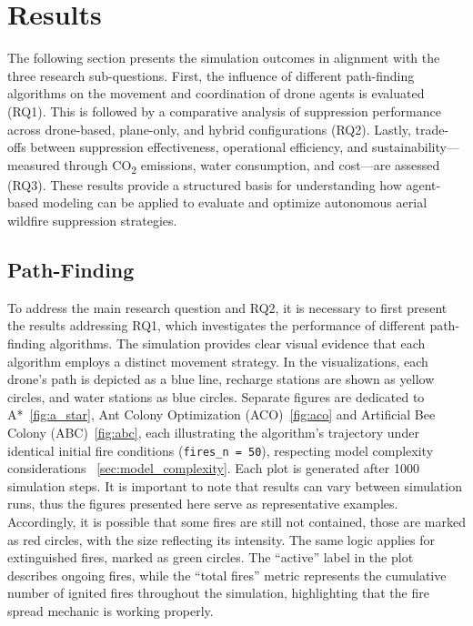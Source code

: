 \documentclass[11pt, a4paper]{article}
\begin{document}
\section{Results}

The following section presents the simulation outcomes in alignment with the three research sub-questions. First, the influence of different path-finding algorithms on the movement and coordination of drone agents is evaluated (RQ1). This is followed by a comparative analysis of suppression performance across drone-based, plane-only, and hybrid configurations (RQ2). Lastly, trade-offs between suppression effectiveness, operational efficiency, and sustainability—measured through CO\textsubscript{2} emissions, water consumption, and cost—are assessed (RQ3). These results provide a structured basis for understanding how agent-based modeling can be applied to evaluate and optimize autonomous aerial wildfire suppression strategies.

\subsection{Path-Finding}
To address the main research question and RQ2, it is necessary to first present the results addressing RQ1, which investigates the performance of different path-finding algorithms. The simulation provides clear visual evidence that each algorithm employs a distinct movement strategy. In the visualizations, each drone’s path is depicted as a blue line, recharge stations are shown as yellow circles, and water stations as blue circles. Separate figures are dedicated to A*~\ref{fig:a_star}, Ant Colony Optimization (ACO)~\ref{fig:aco} and Artificial Bee Colony (ABC)~\ref{fig:abc}, each illustrating the algorithm’s trajectory under identical initial fire conditions (\texttt{fires\_n = 50}), respecting model complexity considerations ~\ref{sec:model_complexity}. Each plot is generated after 1000 simulation steps.
It is important to note that results can vary between simulation runs, thus the figures presented here serve as representative examples. Accordingly, it is possible that some fires are still not contained, those are marked as red circles, with the size reflecting its intensity. The same logic applies for extinguished fires, marked as green circles.
The ``active'' label in the plot describes ongoing fires, while the ``total fires'' metric represents the cumulative number of ignited fires throughout the simulation, highlighting that the fire spread mechanic is working properly.
\end{document}
